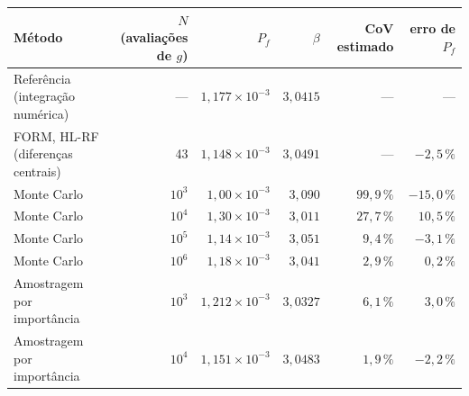 \begin{tabular}{@{}l r r r r r@{}}
\toprule
Método & $N$ (avaliações de $g$) & $P_f$ & $\beta$ & CoV estimado & erro de $P_f$ \\
\midrule
Referência (integração numérica) & --- & $1{,}177\times 10^{-3}$ & $3{,}0415$ & --- & --- \\
FORM, HL-RF (diferenças centrais) & 43 & $1{,}148\times 10^{-3}$ & $3{,}0491$ & --- & $-2{,}5\,\%$ \\
Monte Carlo & $10^{3}$ & $1{,}00\times 10^{-3}$ & $3{,}090$ & $99{,}9\,\%$ & $-15{,}0\,\%$ \\
Monte Carlo & $10^{4}$ & $1{,}30\times 10^{-3}$ & $3{,}011$ & $27{,}7\,\%$ & $10{,}5\,\%$ \\
Monte Carlo & $10^{5}$ & $1{,}14\times 10^{-3}$ & $3{,}051$ & $9{,}4\,\%$ & $-3{,}1\,\%$ \\
Monte Carlo & $10^{6}$ & $1{,}18\times 10^{-3}$ & $3{,}041$ & $2{,}9\,\%$ & $0{,}2\,\%$ \\
Amostragem por importância & $10^{3}$ & $1{,}212\times 10^{-3}$ & $3{,}0327$ & $6{,}1\,\%$ & $3{,}0\,\%$ \\
Amostragem por importância & $10^{4}$ & $1{,}151\times 10^{-3}$ & $3{,}0483$ & $1{,}9\,\%$ & $-2{,}2\,\%$ \\
\bottomrule
\end{tabular}
